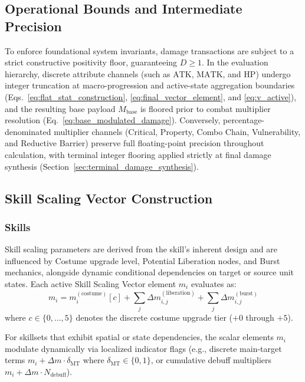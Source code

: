 \documentclass[twocolumn,10pt]{article}
\begin{document}
\subsection{Operational Bounds and Intermediate Precision}
To enforce foundational system invariants, damage transactions are subject to a strict constructive positivity floor, guaranteeing $D \ge 1$. In the evaluation hierarchy, discrete attribute channels (such as $\text{ATK}$, $\text{MATK}$, and $\text{HP}$) undergo integer truncation at macro-progression and active-state aggregation boundaries (Eqs.~\ref{eq:flat_stat_construction}, \ref{eq:final_vector_element}, and \ref{eq:v_active}), and the resulting base payload $M_{\text{base}}$ is floored prior to combat multiplier resolution (Eq.~\ref{eq:base_modulated_damage}). Conversely, percentage-denominated multiplier channels (Critical, Property, Combo Chain, Vulnerability, and Reductive Barrier) preserve full floating-point precision throughout calculation, with terminal integer flooring applied strictly at final damage synthesis (Section~\ref{sec:terminal_damage_synthesis}).
\subsection{Skill Scaling Vector Construction}
\subsubsection{Skills}
Skill scaling parameters are derived from the skill's inherent design and are influenced by Costume upgrade level, Potential Liberation nodes, and Burst mechanics, alongside dynamic conditional dependencies on target or source unit states. Each active Skill Scaling Vector element $m_i$ evaluates as:
\begin{equation}
\label{eq:skill_scaling_element}
m_i = m_i^{(\text{costume})}[c] + \sum_j \Delta m_{i,j}^{(\text{liberation})} + \sum_j \Delta m_{i,j}^{(\text{burst})}
\end{equation}
where $c \in \{0, \dots, 5\}$ denotes the discrete costume upgrade tier ($+0$ through $+5$). 

For skillsets that exhibit spatial or state dependencies, the scalar elements $m_i$ modulate dynamically via localized indicator flags (e.g., discrete main-target terms $m_i + \Delta m \cdot \delta_{\text{MT}}$ where $\delta_{\text{MT}} \in \{0, 1\}$, or cumulative debuff multipliers $m_i + \Delta m \cdot N_{\text{debuff}}$).
\end{document}
